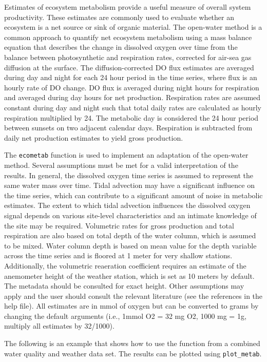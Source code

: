 \documentclass[10pt,letterpaper]{article}\usepackage[]{graphicx}\usepackage[]{color}
\begin{document}
Estimates of ecosystem metabolism provide a useful measure of overall system productivity.  These estimates are commonly used to evaluate whether an ecosystem is a net source or sink of organic material.  The open-water method is a common approach to quantify net ecosystem metabolism using a mass balance equation that describes the change in dissolved oxygen over time from the balance between photosynthetic and respiration rates, corrected for air-sea gas diffusion at the surface.  The diffusion-corrected DO flux estimates are averaged during day and night for each 24 hour period in the time series, where flux is an hourly rate of DO change. DO flux is averaged during night hours for respiration and averaged during day hours for net production. Respiration rates are assumed constant during day and night such that total daily rates are calculated as hourly respiration multiplied by 24. The metabolic day is considered the 24 hour period between sunsets on two adjacent calendar days.  Respiration is subtracted from daily net production estimates to yield gross production.  

The \texttt{ecometab} function is used to implement an adaptation of the open-water method.  Several assumptions must be met for a valid interpretation of the results.  In general, the dissolved oxygen time series is assumed to represent the same water mass over time.  Tidal advection may have a significant influence on the time series, which can contribute to a significant amount of noise in metabolic estimates.  The extent to which tidal advection influences the dissolved oxygen signal depends on various site-level characteristics and an intimate knowledge of the site may be required.  Volumetric rates for gross production and total respiration are also based on total depth of the water column, which is assumed to be mixed.  Water column depth is based on mean value for the depth variable across the time series and is floored at 1 meter for very shallow stations.  Additionally, the volumetric reaeration coefficient requires an estimate of the anemometer height of the weather station, which is set as 10 meters by default.  The metadata should be consulted for exact height. Other assumptions may apply and the user should consult the relevant literature (see the references in the help file).  All estimates are in mmol of oxygen but can be converted  to grams by changing the default arguments (i.e., 1mmol O2 = 32 mg O2, 1000 mg = 1g, multiply all estimates by 32/1000). 

The following is an example that shows how to use the function from a combined water quality and weather data set.  The results can be plotted using \texttt{plot\_metab}.
\end{document}
